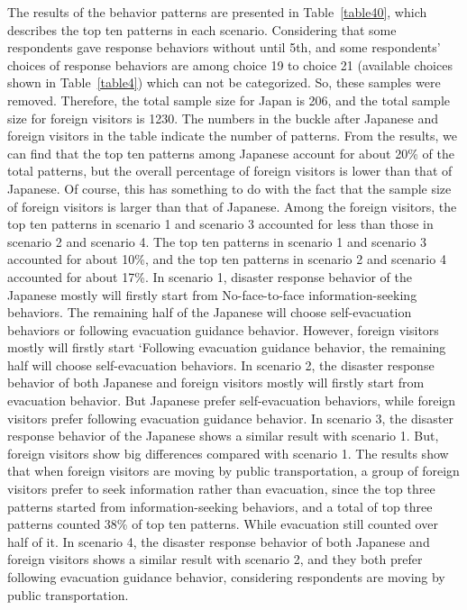 The results of the behavior patterns are presented in Table~\ref{table40}, which describes the top ten patterns in each scenario. Considering that some respondents gave response behaviors without until 5th, and some respondents' choices of response behaviors are among choice 19 to choice 21 (available choices shown in Table~\ref{table4}) which can not be categorized. So, these samples were removed. Therefore, the total sample size for Japan is 206, and the total sample size for foreign visitors is 1230. The numbers in the buckle after Japanese and foreign visitors in the table indicate the number of patterns. From the results, we can find that the top ten patterns among Japanese account for about 20\% of the total patterns, but the overall percentage of foreign visitors is lower than that of Japanese. Of course, this has something to do with the fact that the sample size of foreign visitors is larger than that of Japanese. Among the foreign visitors, the top ten patterns in scenario 1 and scenario 3 accounted for less than those in scenario 2 and scenario 4. The top ten patterns in scenario 1 and scenario 3 accounted for about 10\%, and the top ten patterns in scenario 2 and scenario 4 accounted for about 17\%. In scenario 1, disaster response behavior of the Japanese mostly will firstly start from No-face-to-face information-seeking behaviors. The remaining half of the Japanese will choose self-evacuation behaviors or following evacuation guidance behavior. However, foreign visitors mostly will firstly start ‘Following evacuation guidance behavior, the remaining half will choose self-evacuation behaviors. In scenario 2, the disaster response behavior of both Japanese and foreign visitors mostly will firstly start from evacuation behavior. But Japanese prefer self-evacuation behaviors, while foreign visitors prefer following evacuation guidance behavior. In scenario 3, the disaster response behavior of the Japanese shows a similar result with scenario 1. But, foreign visitors show big differences compared with scenario 1. The results show that when foreign visitors are moving by public transportation, a group of foreign visitors prefer to seek information rather than evacuation, since the top three patterns started from information-seeking behaviors, and a total of top three patterns counted 38\% of top ten patterns. While evacuation still counted over half of it. In scenario 4, the disaster response behavior of both Japanese and foreign visitors shows a similar result with scenario 2, and they both prefer following evacuation guidance behavior, considering respondents are moving by public transportation.

